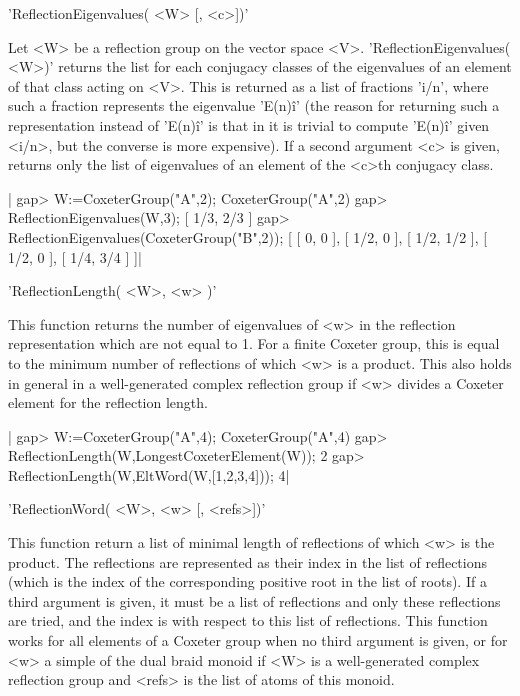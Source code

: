 
'ReflectionEigenvalues( <W> [, <c>])'

Let <W> be a reflection group on the vector space <V>.
'ReflectionEigenvalues(  <W>)' returns the list  for each conjugacy classes
of  the eigenvalues  of an  element of  that class  acting on  <V>. This is
returned as a list of fractions 'i/n', where such a fraction represents the
eigenvalue  'E(n)\^i'  (the  reason  for  returning  such  a representation
instead  of 'E(n)\^i' is that in {\GAP}  it is trivial to compute 'E(n)\^i'
given  <i/n>, but the converse is more expensive). If a second argument <c>
is  given, returns only the list of  eigenvalues of an element of the <c>th
conjugacy class.

|    gap> W:=CoxeterGroup("A",2);
    CoxeterGroup("A",2)
    gap> ReflectionEigenvalues(W,3);
    [ 1/3, 2/3 ]
    gap> ReflectionEigenvalues(CoxeterGroup("B",2));
    [ [ 0, 0 ], [ 1/2, 0 ], [ 1/2, 1/2 ], [ 1/2, 0 ], [ 1/4, 3/4 ] ]|


'ReflectionLength( <W>, <w> )'

This  function returns the  number of eigenvalues  of <w> in the reflection
representation  which are not equal to 1.  For a finite Coxeter group, this
is  equal to the minimum  number of reflections of  which <w> is a product.
This  also holds in general in a well-generated complex reflection group if
<w> divides a Coxeter element for the reflection length.

|    gap> W:=CoxeterGroup("A",4);
    CoxeterGroup("A",4)
    gap> ReflectionLength(W,LongestCoxeterElement(W));
    2
    gap> ReflectionLength(W,EltWord(W,[1,2,3,4]));
    4|


'ReflectionWord( <W>, <w> [, <refs>])'

This  function return a list of minimal  length of reflections of which <w>
is  the product. The reflections are represented as their index in the list
of  reflections (which is  the index of  the corresponding positive root in
the  list of roots).  If a third  argument is given,  it must be  a list of
reflections  and only  these reflections  are tried,  and the index is with
respect  to this list of reflections.  This function works for all elements
of  a Coxeter group when no third argument is given, or for <w> a simple of
the  dual braid monoid if <W>  is a well-generated complex reflection group
and <refs> is the list of atoms of this monoid.

